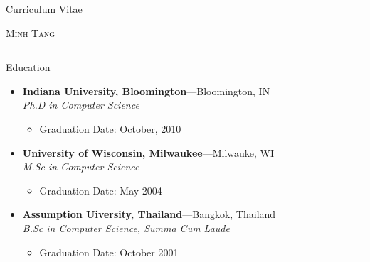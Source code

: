 \documentclass[12pt,reqno,final,ugsabstract,ugsabstractsigs]{iuthesis}
\theoremstyle{definition}
\numberwithin{equation}{chapter}
\numberwithin{section}{chapter}
\newcommand{\name}{Minh Tang}
\newcommand{\bigname}[1]{
        \begin{center}\fontfamily{phv}\selectfont\Large\scshape#1\end{center}
}
\newenvironment{ressection}[1]{
	\vspace{4pt}
	{\fontfamily{phv}\selectfont\Large#1}
	\begin{itemize}
	\vspace{3pt}
}{
	\end{itemize}
}
\newcommand{\ressubitem}[1]{
	\vspace{-1pt}
	\item \begin{flushleft} #1 \end{flushleft}
}
\newcommand{\resbigitem}[3]{
	\vspace{-5pt}
	\item
	\textbf{#1}---#2 \\
	\textit{#3}
}
\newenvironment{ressubsec}[3]{
	\resbigitem{#1}{#2}{#3}
	\vspace{-2pt}
	\begin{itemize}
}{
	\end{itemize}
}
\begin{document}
\setlength{\parindent}{0in}
\setlength{\parskip}{0in}
\setlength{\itemsep}{0in}
\setlength{\topsep}{0in}
\setlength{\tabcolsep}{0in}





\vspace{-1pt} {\begin{center} \Huge Curriculum Vitae \end{center}}

\bigname{\name}

\vspace{-8pt} \rule{\textwidth}{1pt}


\vspace{8 pt}

\begin{ressection}{Education}

	\begin{ressubsec}{Indiana University, Bloomington}{Bloomington, IN}{Ph.D in
        Computer Science}
		\ressubitem{Graduation Date: October, 2010}
	\end{ressubsec}
	\begin{ressubsec}{University of Wisconsin, Milwaukee}{Milwauke,
        WI}{M.Sc in Computer Science}
		\ressubitem{Graduation Date: May 2004}
	\end{ressubsec}
	\begin{ressubsec}{Assumption Uiversity, Thailand}{Bangkok,
        Thailand}{B.Sc in Computer Science, Summa Cum Laude}
		\ressubitem{Graduation Date: October 2001}
	\end{ressubsec}
\end{ressection}
\end{document}
